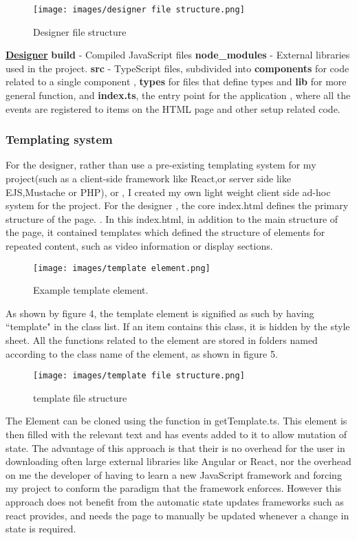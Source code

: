 \documentclass{article}
\begin{document}
\begin{figure}[h]
    \centering
    \texttt{[image: images/designer file structure.png]} 
    \caption{Designer file structure}
    \label{fig:my_label}
\end{figure}


\underline{\textbf{Designer}} \newline
\textbf{build} - Compiled JavaScript files \newline
\textbf{node\_modules} - External libraries used in the project. \newline
\textbf{src} - TypeScript files, subdivided into \textbf{components} for code related to a single component , \textbf{types} for files that define types and \textbf{lib} for more general function, and \textbf{index.ts}, the entry point for the application , where all the events are registered to items on the HTML page and other setup related code.
 

\subsubsection{Templating system}
For the designer, rather than use a pre-existing templating system for my project(such as a client-side framework like React,or server side like EJS,Mustache or PHP), or , I created my own light weight  client side ad-hoc system for the project. For the designer , the core index.html defines the primary structure of the page. \cite{designer_index.html}. In this index.html, in addition to the main structure of the page, it contained templates which defined the structure of elements for repeated content, such as video information or display sections.
\begin{figure}[h]
    \centering
    \texttt{[image: images/template element.png]}
    \caption{Example template element.}
    \label{fig:my_label}
\end{figure}
As shown by figure 4, the template element is signified as such by having ``template" in the class list. If an item contains this class, it is hidden by the style sheet. All the functions related to the element are stored in folders named according to the class name of the element, as shown in figure 5.
\begin{figure}[h]
    \centering
    \texttt{[image: images/template file structure.png]}
    \caption{template file structure}
    \label{fig:my_label}
\end{figure}
The Element can be cloned using the function in getTemplate.ts. This element is then filled with the relevant text and has events added to it to allow mutation of state. The advantage of this approach is that their is no overhead for the user in downloading often large external libraries like Angular or React, nor the overhead on me the developer of having to learn a new JavaScript framework and forcing my project to conform the paradigm that the framework enforces. However this approach does not benefit from the automatic state updates frameworks such as react provides, and needs the page to manually be updated whenever a change in state is required.
\end{document}
